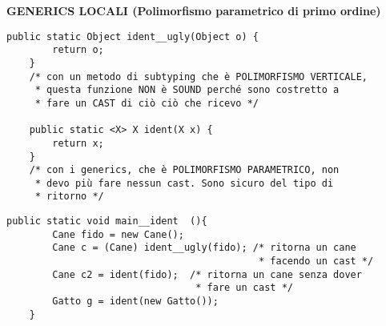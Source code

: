 \noindent \textbf{GENERICS LOCALI (Polimorfismo parametrico di primo ordine)} 

\begin{lstlisting}[basicstyle=\small,]
    public static Object ident__ugly(Object o) {
        return o;
    }   
    /* con un metodo di subtyping che è POLIMORFISMO VERTICALE, 
     * questa funzione NON è SOUND perché sono costretto a 
     * fare un CAST di ciò ciò che ricevo */

    public static <X> X ident(X x) {
        return x;
    }   
    /* con i generics, che è POLIMORFISMO PARAMETRICO, non
     * devo più fare nessun cast. Sono sicuro del tipo di
     * ritorno */
\end{lstlisting}

\begin{lstlisting}[basicstyle=\small,]
	public static void main__ident	(){
		Cane fido = new Cane();
		Cane c = (Cane) ident__ugly(fido); /* ritorna un cane 
											* facendo un cast */
		Cane c2 = ident(fido);  /* ritorna un cane senza dover 
								 * fare un cast */ 
		Gatto g = ident(new Gatto());
	}
\end{lstlisting}





















